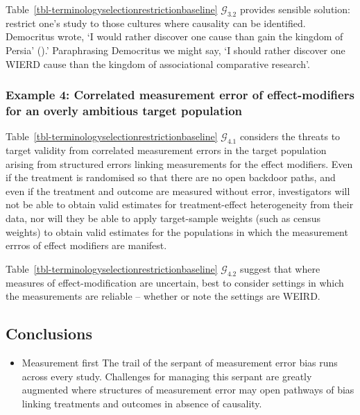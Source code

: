 \documentclass[
  single column]{article}
\providecommand{\tightlist}{%
  \setlength{\itemsep}{0pt}\setlength{\parskip}{0pt}}\usepackage{longtable,booktabs,array}
\begin{document}
Table~\ref{tbl-terminologyselectionrestrictionbaseline}
\(\mathcal{G}_{3.2}\) provides sensible solution: restrict one's study
to those cultures where causality can be identified. Democritus wrote,
`I would rather discover one cause than gain the kingdom of Persia'
().' Paraphrasing
Democritus we might say, `I should rather discover one WIERD cause than
the kingdom of associational comparative research'.

\subsubsection{Example 4: Correlated measurement error of
effect-modifiers for an overly ambitious target
population}\label{example-4-correlated-measurement-error-of-effect-modifiers-for-an-overly-ambitious-target-population}

Table~\ref{tbl-terminologyselectionrestrictionbaseline}
\(\mathcal{G}_{4.1}\) considers the threats to target validity from
correlated measurement errors in the target population arising from
structured errors linking measurements for the effect modifiers. Even if
the treatment is randomised so that there are no open backdoor paths,
and even if the treatment and outcome are measured without error,
investigators will not be able to obtain valid estimates for
treatment-effect heterogeneity from their data, nor will they be able to
apply target-sample weights (such as census weights) to obtain valid
estimates for the populations in which the measurement errros of effect
modifiers are manifest.

Table~\ref{tbl-terminologyselectionrestrictionbaseline}
\(\mathcal{G}_{4.2}\) suggest that where measures of effect-modification
are uncertain, best to consider settings in which the measurements are
reliable -- whether or note the settings are WEIRD.

\subsection{Conclusions}\label{conclusions}

\begin{itemize}
\tightlist
\item
  Measurement first The trail of the serpant of measurement error bias
  runs across every study. Challenges for managing this serpant are
  greatly augmented where structures of measurement error may open
  pathways of bias linking treatments and outcomes in absence of
  causality.
\end{itemize}
\end{document}
